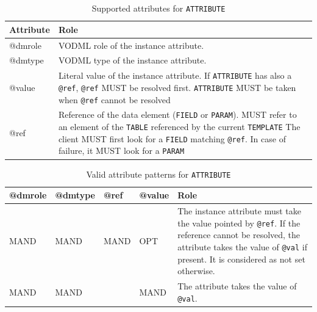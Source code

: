 \documentclass[11pt,a4paper]{ivoa}
\begin{document}
\begin{table}[!htbp]
     \begin{tabular}{|p{1.5cm}|p{10.5cm}|}
       \hline Attribute & Role\\
       \hline  
      @dmrole    & VODML role of the instance attribute.\\       
       \hline 
      @dmtype    & VODML type of the instance attribute.\\
       \hline  
      @value   & Literal value of the instance attribute. 
                     \newline If  \texttt{ATTRIBUTE} has also a \texttt{@ref}, \texttt{@ref} MUST be resolved first.
                     \texttt{ATTRIBUTE}  MUST be taken when \texttt{@ref} cannot be resolved \\
        \hline
       @ref & Reference of the data element (\texttt{FIELD} or \texttt{PARAM}).  
                    \newline MUST refer to an element of the \texttt{TABLE}  referenced by the current     
                    \texttt{TEMPLATE}                    
                    \newline The client MUST first look for a \texttt{FIELD} matching \texttt{@ref}. 
                    \newline In case of failure, it MUST look for a \texttt{PARAM}
                    \\
       \hline 
     \end{tabular}
     \caption{Supported attributes for  \texttt{ATTRIBUTE}} 
     \label{tbl:att-att}
 \end{table}

\begin{table}[!htbp]
  \begin{tabular}{|p{1.5cm}|p{1.5cm}|p{1.5cm}|p{1.5cm}|p{6cm}|}
    \hline @dmrole  &  @dmtype &  @ref &  @value &  Role\\
    \hline  MAND & MAND &  MAND &  OPT & The instance attribute must take the value pointed by \texttt{@ref}. 
              If the reference cannot be resolved, the attribute takes the value of \texttt{@val} if present. It is considered as not set otherwise.   \\
    \hline  MAND & MAND &   &  MAND & The attribute takes the value of \texttt{@val}.   \\
     \hline 
  \end{tabular}
  \caption{Valid attribute patterns for  \texttt{ATTRIBUTE}} 
  \label{tbl:att-pattern}
 \end{table}
\end{document}
